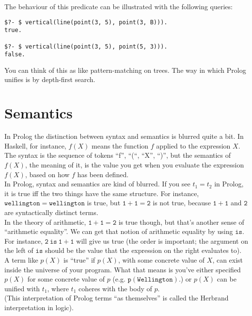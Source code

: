 \documentclass[a4paper,12pt]{article}
\newcommand{\kwa}[1]{\mathtt{#1}}
\begin{document}
\noindent
The behaviour of this predicate can be illustrated with the following queries:

\begin{lstlisting}
$?- $ vertical(line(point(3, 5), point(3, B))).
true.

$?- $ vertical(line(point(3, 5), point(5, 3))).
false.
\end{lstlisting}

\noindent
You can think of this as like pattern-matching on trees. The way in which Prolog unifies is by depth-first search.

\section{Semantics}

\noindent
In Prolog the distinction between syntax and semantics is blurred quite a bit. In Haskell, for instance, $f(X)$ means the function $f$ applied to the expression $X$. The syntax is the sequence of tokens ``f'', ``(``, ``X'', ``)'', but the semantics of $f(X)$, the meaning of it, is the value you get when you evaluate the expression $f(X)$, based on how $f$ has been defined. \\

\noindent
In Prolog, syntax and semantics are kind of blurred. If you see $t_1 = t_2$ in Prolog, it is true iff the two things have the same structure. For instance, $\kwa{wellington = wellington}$ is true, but $\kwa{1 + 1= 2}$ is not true, because $\kwa{1 + 1}$ and $\kwa{2}$ are syntactically distinct terms. \\

\noindent
In the theory of arithmetic, $\kwa{1 + 1 = 2}$ is true though, but that's another sense of ``arithmetic equality''. We can get that notion of arithmetic equality by using $\kwa{is}$. For instance, $\kwa{2~is~1+1}$ will give us true (the order is important; the argument on the left of $\kwa{is}$ should be the value that the expression on the right evaluates to). \\

\noindent
A term like $p(X)$ is ``true'' if $p(X)$, with some concrete value of $X$, can exist inside the universe of your program. What that means is you've either specified $p(X)$ for some concrete value of $p$ (e.g. $\kwa{p(Wellington)}$.) or $p(X)$ can be unified with $t_1$, where $t_1$ coheres with the body of $p$. \\

\noindent
(This interpretation of Prolog terms ``as themselves'' is called the Herbrand interpretation in logic).
\end{document}
